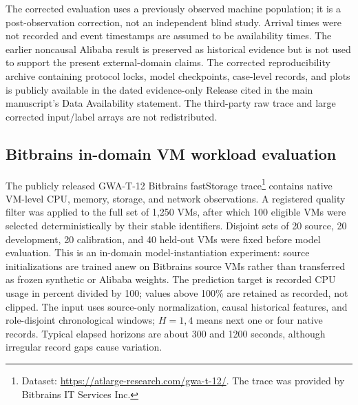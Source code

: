 \documentclass[11pt,a4paper]{article}
\begin{document}
The corrected evaluation uses a previously observed machine population;
it is a post-observation correction, not an independent blind study. Arrival times were not recorded and event timestamps are assumed to
be availability times. The earlier noncausal Alibaba result is preserved as
historical evidence but is not used to support the present external-domain
claims. The corrected reproducibility archive containing protocol locks, model checkpoints, case-level records, and plots is publicly available in the dated evidence-only Release cited in the main manuscript's Data Availability statement. The third-party raw trace and large corrected input/label
arrays are not redistributed.


\subsection{Bitbrains in-domain VM workload evaluation}
\label{supp:bitbrains}

The publicly released GWA-T-12 Bitbrains fastStorage trace\footnote{Dataset: \url{https://atlarge-research.com/gwa-t-12/}.
The trace was provided by Bitbrains IT Services Inc.} contains native
VM-level CPU, memory, storage, and network observations. A registered quality
filter was applied to the full set of 1,250 VMs, after which 100 eligible VMs
were selected deterministically by their stable identifiers. Disjoint sets of
20 source, 20 development, 20 calibration, and 40 held-out VMs were fixed
before model evaluation. This is an in-domain model-instantiation experiment:
source initializations are trained anew on Bitbrains source VMs rather than
transferred as frozen synthetic or Alibaba weights. The prediction target is
recorded CPU usage in percent divided by 100; values above 100\% are retained
as recorded, not clipped. The input uses source-only normalization, causal
historical features, and role-disjoint chronological windows; $H=1,4$ means
next one or four native records. Typical elapsed horizons are about 300 and
1200 seconds, although irregular record gaps cause variation.
\end{document}
